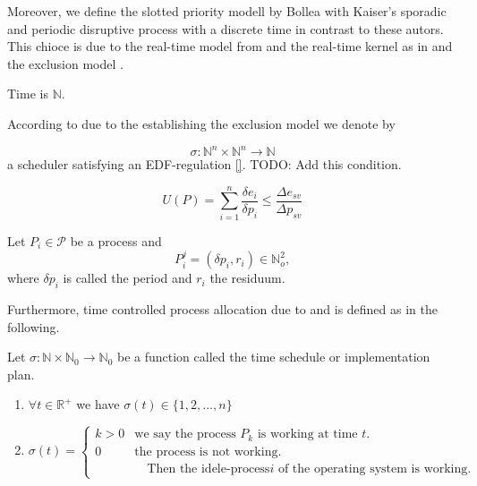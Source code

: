 Moreover, we define the slotted priority modell by Bollea with Kaiser's sporadic and periodic disruptive process with a discrete time in contrast to these autors.
This chioce is due to the real-time model from \cite{PROSA_schedubility_analysis} and the real-time kernel as in  \cite[chp. 5.3]{B} and the exclusion model  \cite[p.12]{B}.

\begin{definition}
	Time is $\mathbb{N}$.
\end{definition}

According to \cite[]{} due to the establishing the exclusion model we denote by

\begin{equation}
\sigma: \mathbb{N}^n \times \mathbb{N}^n\longrightarrow \mathbb{N} 
\end{equation}
a scheduler satisfying an EDF-regulation \ref{}. TODO: Add this condition.

\begin{equation}
U(P) = \sum\limits_{i=1}^n \frac{\delta e_i}{\delta p_i} \leq \frac{\Delta e_{sv}}{\Delta p_{sv}}
\end{equation}

\begin{definition}
Let $P_i\in \mathcal{P}$ be a process and 
\begin{equation}
P^j_i = ( \delta p_i, r_i) \in \mathbb{N}_o^2,  
\end{equation}
where $\delta p_i$ is called the period and $r_i$ the residuum. 
\end{definition}
Furthermore, time controlled process allocation due to \cite{B} and \cite[p. 34]{K} is defined as in the following.

\begin{definition}
Let $\sigma: \mathbb{N} \times \mathbb{N}_0 \rightarrow \mathbb{N}_0$ be a function called the time schedule or implementation plan.
\begin{enumerate}
\item $\forall t \in \mathbb{R}^+$ we have $\sigma(t)\in \{1,2,...,n\}$
\item \begin{equation}
		\sigma(t) =
		\begin{cases}
			k > 0 & \text{we say the process $P_k$ is working at time $t$.}\\
			0 & \text{the process is not working.}\\
			  &\quad  \text{Then the idele-process$i$ of the operating system is working.}
		\end{cases}       
\end{equation}
\end{enumerate}
\end{definition}

